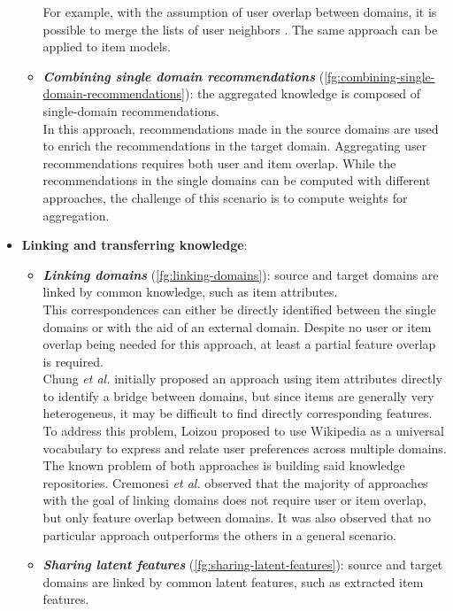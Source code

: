 \begin{itemize}
\begin{itemize}
For example, with the assumption of user overlap between domains, it is possible to merge the lists of user neighbors \cite{10.1145/1297231.1297238}. The same approach can be applied to item models.
\item \textbf{\textit{Combining single domain recommendations}} (\autoref{fg:combining-single-domain-recommendations}): the aggregated knowledge is composed of single-domain recommendations.\\
In this approach, recommendations made in the source domains are used to enrich the recommendations in the target domain. Aggregating user recommendations requires both user and item overlap. While the recommendations in the single domains can be computed with different approaches, the challenge of this scenario is to compute weights for aggregation.
\end{itemize}
\item \textbf{Linking and transferring knowledge}:
\begin{itemize}
\item \textbf{\textit{Linking domains}} (\autoref{fg:linking-domains}): source and target domains are linked by common knowledge, such as item attributes.\\
This correspondences can either be directly identified between the single domains or with the aid of an external domain. Despite no user or item overlap being needed for this approach, at least a partial feature overlap is required.\\
Chung \textit{et al.} \cite{10.1145/1282100.1282113} initially proposed an approach using item attributes directly to identify a bridge between domains, but since items are generally very heterogeneus, it may be difficult to find directly corresponding features. To address this problem, Loizou \cite{crossdomain-recsys-categorization} proposed to use Wikipedia as a universal vocabulary to express and relate user preferences across multiple domains.\\
The known problem of both approaches is building said knowledge repositories. Cremonesi \textit{et al.} \cite{10.1007/978-1-4899-7637-6_27} observed that the majority of approaches with the goal of linking domains does not require user or item overlap, but only feature overlap between domains. It was also observed that no particular approach outperforms the others in a general scenario.
\item \textbf{\textit{Sharing latent features}} (\autoref{fg:sharing-latent-features}): source and target domains are linked by common latent features, such as extracted item features.\\

\end{itemize}
\end{itemize}
